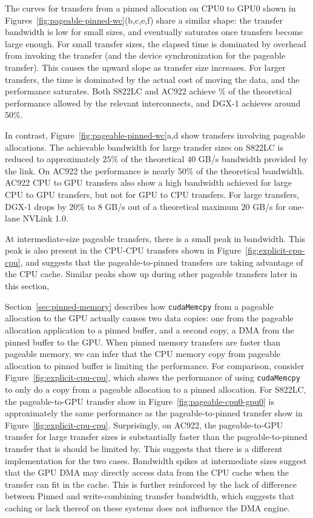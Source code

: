 The curves for transfers from a pinned allocation on CPU0 to GPU0 shown in Figures~\ref{fig:pageable-pinned-wc}(b,c,e,f) share a similar shape: the transfer bandwidth is low for small sizes, and eventually saturates once transfers become large enough.
For small transfer sizes, the elapsed time is dominated by overhead from invoking the transfer (and the device synchronization for the pageable transfer).
This causes the upward slope as transfer size increases.
For larger transfers, the time is dominated by the actual cost of moving the data, and the performance saturates.
Both S822LC and AC922 achieve \% of the theoretical performance allowed by the relevant interconnects, and DGX-1 achieves around 50\%.

In contrast, Figure~\ref{fig:pageable-pinned-wc}a,d show transfers involving pageable allocations.
The achievable bandwidth for large transfer sizes on S822LC is reduced to approximately $25\%$ of the theoretical $40$ GB/s bandwidth provided by the link.
On AC922 the performance is nearly $50\%$ of the theoretical bandwidth.
AC922 CPU to GPU transfers also show a high bandwidth achieved for large CPU to GPU transfers, but not for GPU to CPU transfers.
For large transfers, DGX-1 drops by $20\%$ to $8$ GB/s out of a theoretical maximum $20$ GB/s for one-lane NVLink 1.0.

At intermediate-size pageable transfers, there is a small peak in bandwidth.
This peak is also present in the CPU-CPU transfers shown in Figure~\ref{fig:explicit-cpu-cpu}, and suggests that the pageable-to-pinned transfers are taking advantage of the CPU cache.
Similar peaks show up during other pageable transfers later in this section, 


Section~\ref{sec:pinned-memory} describes how \texttt{cudaMemcpy} from a pageable allocation to the GPU actually causes two data copies: one from the pageable allocation application to a pinned buffer, and a second copy, a DMA from the pinned buffer to the GPU.
When pinned memory transfers are faster than pageable memory, we can infer that the CPU memory copy from pageable allocation to pinned buffer is limiting the performance.
For comparison, consider Figure~\ref{fig:explicit-cpu-cpu}, which shows the performance of using \texttt{cudaMemcpy} to only do a copy from a pageable allocation to a pinned allocation.
For S822LC, the pageable-to-GPU transfer show in Figure~\ref{fig:pageable-cpu0-gpu0} is approximately the same performance as the pageable-to-pinned transfer show in Figure~\ref{fig:explicit-cpu-cpu}.
Surprisingly, on AC922, the pageable-to-GPU transfer for large transfer sizes is substantially faster than the pageable-to-pinned transfer that is should be limited by.
This suggests that there is a different implementation for the two cases.
Bandwidth spikes at intermediate sizes suggest that the GPU DMA may directly access data from the CPU cache when the transfer can fit in the cache.
This is further reinforced by the lack of difference between Pinned and write-combining transfer bandwidth, which suggests that caching or lack thereof on these systems does not influence the DMA engine.



